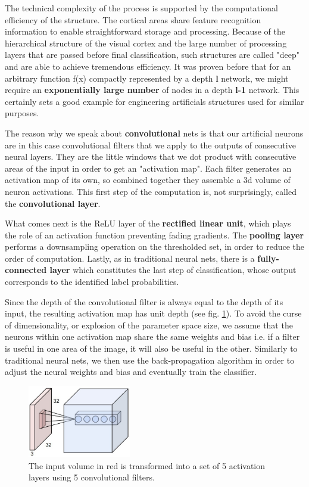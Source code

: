 \documentclass[a4paper, 12pt]{article}
\numberwithin{equation}{section}
\begin{document}
	The technical complexity of the process is supported by the computational efficiency of the structure. The cortical areas share feature recognition information to enable straightforward storage and processing. Because of the hierarchical structure of the visual cortex and the large number of processing layers that are passed before final classification, such structures are called "deep" and are able to achieve tremendous efficiency. It was proven before that for an arbitrary function f(x) compactly represented by a depth \textbf{l} network, we might require an \textbf{exponentially large number} of nodes in a depth \textbf{l-1} network. This certainly sets a good example for engineering artificials structures used for similar purposes.
	
	The reason why we speak about \textbf{convolutional} nets \cite{stanford2016convnets} is that our artificial neurons are in this case convolutional filters that we apply to the outputs of consecutive neural layers. They are the little windows that we dot product with consecutive areas of the input in order to get an "activation map". Each filter generates an activation map of its own, so combined together they assemble a 3d volume of neuron activations. This first step of the computation is, not surprisingly, called the \textbf{convolutional layer}.
	
	What comes next is the ReLU layer of the \textbf{rectified linear unit}, which plays the role of an activation function preventing fading gradients. 
	The \textbf{pooling layer} performs a downsampling operation on the thresholded set, in order to reduce the order of computation.
	Lastly, as in traditional neural nets, there is  a \textbf{fully-connected layer} which constitutes the last step of classification, whose output corresponds to the identified label probabilities.
	
	Since the depth of the convolutional filter is always equal to the depth of its input, the resulting activation map has unit depth (see fig. \ref{fig:conv_net}). To avoid the curse of dimensionality, or explosion of the parameter space size, we assume that the neurons within one activation map share the same weights and bias i.e. if a filter is useful in one area of the image, it will also be useful in the other. Similarly to traditional neural nets, we then use the back-propagation algorithm in order to adjust the neural weights and bias and eventually train the classifier.
	
	\begin{figure}[!h]
		\centering
		\includegraphics[page=1,width=0.40\textwidth]{depthcol.jpeg}
		\caption{\label{fig:conv_net}{The input volume in red is transformed into a set of 5 activation layers using 5 convolutional filters.}}
	\end{figure} 
	
\end{document}
